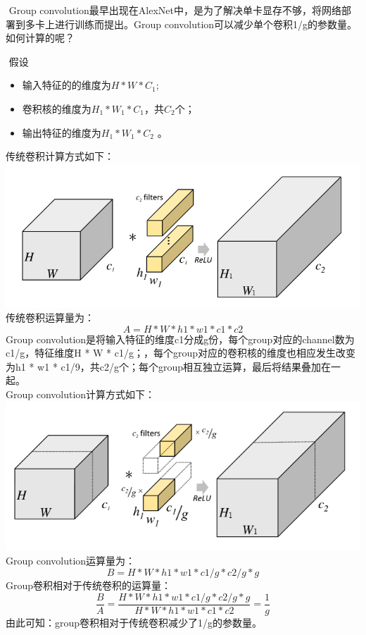 ​ Group
convolution最早出现在AlexNet中，是为了解决单卡显存不够，将网络部署到多卡上进行训练而提出。Group
convolution可以减少单个卷积1/g的参数量。如何计算的呢？

​ 假设

\begin{itemize}
\item
  输入特征的的维度为\(H*W*C_1\);
\item
  卷积核的维度为\(H_1*W_1*C_1\)，共\(C_2\)个；
\item
  输出特征的维度为\(H_1*W_1*C_2\) 。
\end{itemize}

传统卷积计算方式如下：\\
\includegraphics{./img/ch17/1.png} 传统卷积运算量为：\\
\[
A = H*W * h1 * w1 * c1 * c2
\] Group
convolution是将输入特征的维度c1分成g份，每个group对应的channel数为c1/g，特征维度H
* W * c1/g；，每个group对应的卷积核的维度也相应发生改变为h1 * w1 *
c1/9，共c2/g个；每个group相互独立运算，最后将结果叠加在一起。\\
Group convolution计算方式如下：\\
\includegraphics{./img/ch17/2.png} Group convolution运算量为：\\
\[
B = H * W * h1 * w1 * c1/g * c2/g * g
\] Group卷积相对于传统卷积的运算量：\\
\[
\dfrac{B}{A} = \dfrac{ H * W * h1 * w1 * c1/g * c2/g * g}{H * W * h1 * w1 * c1 * c2} = \dfrac{1}{g}
\] 由此可知：group卷积相对于传统卷积减少了1/g的参数量。

